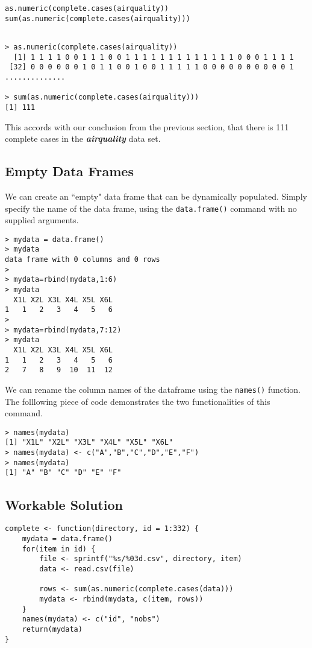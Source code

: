 \documentclass[12pt]{article}
\begin{document}
\begin{framed}
\begin{verbatim}
as.numeric(complete.cases(airquality))
sum(as.numeric(complete.cases(airquality)))
\end{verbatim}
\end{framed}
\begin{verbatim}

> as.numeric(complete.cases(airquality))
  [1] 1 1 1 1 0 0 1 1 1 0 0 1 1 1 1 1 1 1 1 1 1 1 1 1 0 0 0 1 1 1 1
 [32] 0 0 0 0 0 0 1 0 1 1 0 0 1 0 0 1 1 1 1 1 0 0 0 0 0 0 0 0 0 0 1
..............

> sum(as.numeric(complete.cases(airquality)))
[1] 111
\end{verbatim}

\noindent This accords with our conclusion from the previous section, that there is 111 complete cases in the \textit{\textbf{airquality}} data set.
\newpage
\subsection{Empty Data Frames}
We can create an ``empty" data frame that can be dynamically populated. Simply specify the name of the data frame, using the \texttt{data.frame()} command with no supplied arguments.
\begin{verbatim}
> mydata = data.frame()
> mydata
data frame with 0 columns and 0 rows
> 
> mydata=rbind(mydata,1:6)
> mydata
  X1L X2L X3L X4L X5L X6L
1   1   2   3   4   5   6
>
> mydata=rbind(mydata,7:12)
> mydata
  X1L X2L X3L X4L X5L X6L
1   1   2   3   4   5   6
2   7   8   9  10  11  12
\end{verbatim}

We can rename the column names of the dataframe using the \texttt{names()} function. The folllowing piece of code demonstrates the two functionalities of this command.

\begin{verbatim}
> names(mydata)
[1] "X1L" "X2L" "X3L" "X4L" "X5L" "X6L"
> names(mydata) <- c("A","B","C","D","E","F")
> names(mydata)
[1] "A" "B" "C" "D" "E" "F"
\end{verbatim}
\newpage
\subsection{Workable Solution}
\begin{framed}
\begin{verbatim}
complete <- function(directory, id = 1:332) {
    mydata = data.frame()
    for(item in id) {
        file <- sprintf("%s/%03d.csv", directory, item)
        data <- read.csv(file)
        
        rows <- sum(as.numeric(complete.cases(data)))
        mydata <- rbind(mydata, c(item, rows))
    }
    names(mydata) <- c("id", "nobs")
    return(mydata)
}
\end{verbatim}
\end{framed} 
\newpage
\end{document}
